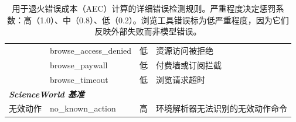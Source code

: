 \begin{table}[!htbp]
\begin{tabular}{lllp{6.4cm}}
 & browse\_access\_denied & 低 & 资源访问被拒绝 \\
 & browse\_paywall & 低 & 付费墙或订阅拦截 \\
 & browse\_timeout & 低 & 浏览请求超时 \\
\midrule
\multicolumn{4}{l}{\textit{\textbf{ScienceWorld 基准}}} \\
\midrule
无效动作 & no\_known\_action & 高 & 环境解析器无法识别的无效动作命令 \\
\bottomrule
\end{tabular}
\caption{用于退火错误成本（AEC）计算的详细错误检测规则。严重程度决定惩罚系数：高（1.0）、中（0.8）、低（0.2）。浏览工具错误标为低严重程度，因为它们反映外部失败而非模型错误。}
\label{tab:error_rules_detail}
\end{table}
